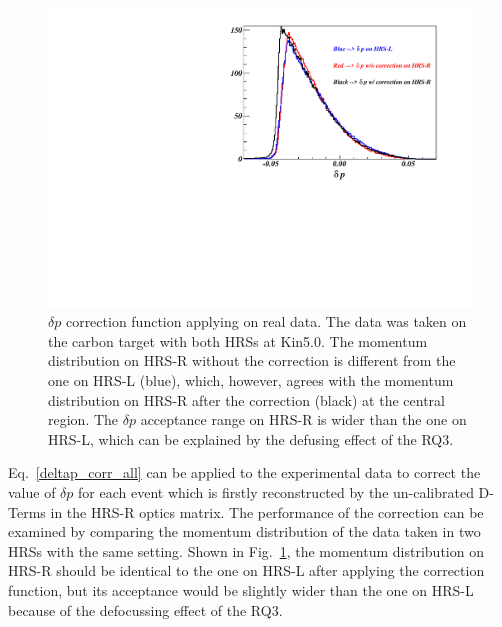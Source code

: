  \begin{figure}[!ht]
 \begin{center}
  \includegraphics[type=pdf, ext=.pdf,read=.pdf,width=1.0\textwidth]{./figures/apend/DeltaP_Corr}
  \caption[$\delta p$ correction function applying on real data]{$\delta p$ correction function applying on real data. The data was taken on the carbon target with both HRSs at Kin5.0. The momentum distribution on HRS-R without the correction is different from the one on HRS-L (blue), which, however, agrees with the momentum distribution on HRS-R after the correction (black) at the central region. The $\delta p$ acceptance range on HRS-R is wider than the one on HRS-L, which can be explained by the defusing effect of the RQ3.}
  \label{deltap_corr_real}
 \end{center}
\end{figure}

 Eq.~\ref{deltap_corr_all} can be applied to the experimental data to correct the value of $\delta p$ for each event which is firstly reconstructed by the un-calibrated D-Terms in the HRS-R optics matrix. The performance of the correction can be examined by comparing the momentum distribution of the data taken in two HRSs with the same setting. Shown in Fig.~\ref{deltap_corr_real}, the momentum distribution on HRS-R should be identical to the one on HRS-L after applying the correction function, but its acceptance would be slightly wider than the one on HRS-L because of the defocussing effect of the RQ3.